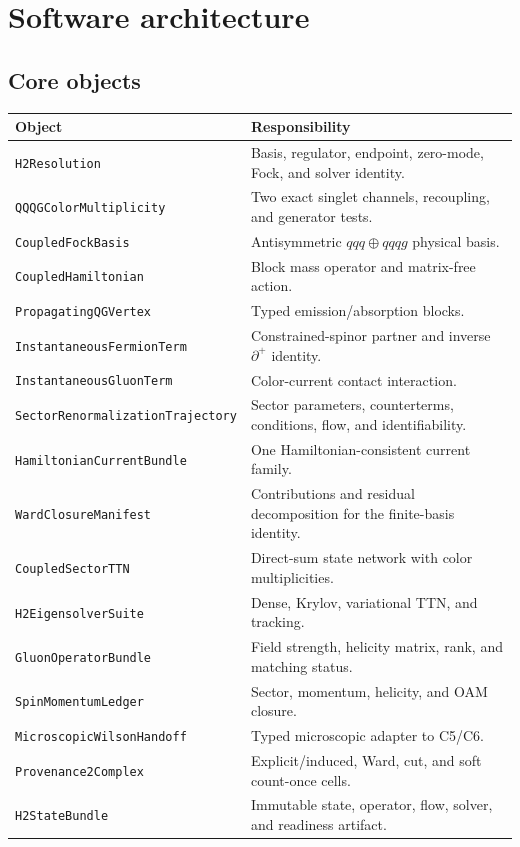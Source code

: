 \documentclass[11pt]{article}
\newcommand{\WardManifest}{\texttt{WardClosureManifest}}
\newcommand{\WilsonHandoff}{\texttt{MicroscopicWilsonHandoff}}
\newcommand{\RenTrajectory}{\texttt{SectorRenormalizationTrajectory}}
\newcommand{\ProvComplex}{\texttt{Provenance2Complex}}
\begin{document}
\section{Software architecture}

\subsection{Core objects}

\begin{longtable}{L{0.36\textwidth}L{0.56\textwidth}}
\toprule
Object & Responsibility\\
\midrule
\endhead
\texttt{H2Resolution} & Basis, regulator, endpoint, zero-mode, Fock, and
solver identity.\\
\texttt{QQQGColorMultiplicity} & Two exact singlet channels, recoupling, and
generator tests.\\
\texttt{CoupledFockBasis} & Antisymmetric \(qqq\oplus qqqg\) physical basis.\\
\texttt{CoupledHamiltonian} & Block mass operator and matrix-free action.\\
\texttt{PropagatingQGVertex} & Typed emission/absorption blocks.\\
\texttt{InstantaneousFermionTerm} & Constrained-spinor partner and inverse
\(\partial^+\) identity.\\
\texttt{InstantaneousGluonTerm} & Color-current contact interaction.\\
\RenTrajectory & Sector parameters, counterterms, conditions, flow, and
identifiability.\\
\texttt{HamiltonianCurrentBundle} & One Hamiltonian-consistent current family.\\
\WardManifest & Contributions and residual decomposition for the finite-basis
identity.\\
\texttt{CoupledSectorTTN} & Direct-sum state network with color multiplicities.\\
\texttt{H2EigensolverSuite} & Dense, Krylov, variational TTN, and tracking.\\
\texttt{GluonOperatorBundle} & Field strength, helicity matrix, rank, and
matching status.\\
\texttt{SpinMomentumLedger} & Sector, momentum, helicity, and OAM closure.\\
\WilsonHandoff & Typed microscopic adapter to C5/C6.\\
\ProvComplex & Explicit/induced, Ward, cut, and soft count-once cells.\\
\texttt{H2StateBundle} & Immutable state, operator, flow, solver, and readiness
artifact.\\
\bottomrule
\end{longtable}
\end{document}
